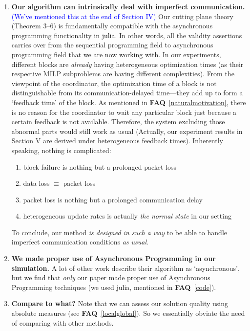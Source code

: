 \documentclass[11pt]{article}
\newcommand{\faq}[1]{\textbf{FAQ}~\ref{#1}}
\newcommand{\blue}[1]{\textcolor{blue}{#1}}
\begin{document}
\begin{enumerate}
    It works really well on my laptop.
    \item \textbf{Our algorithm can intrinsically deal with imperfect communication.}
    \label{imperfectcommunication} \blue{(We've mentioned this at the end of Section IV)}
    Our cutting plane theory (Theorem 3--6) is fundamentally compatible with
    the asynchronous programming functionality in julia. 
    In other words, all the validity assertions carries over from the sequential programming
    field to asynchronous programming field that we are now working with.
    In our experiments, different blocks are \textit{already} having heterogeneous optimization times (as their respective MILP subproblems are having different complexities).
    From the viewpoint of the coordinator, the optimization time of a block is not distinguishable from its communication-delayed time---they add up to form a `feedback time' of the block.
    As mentioned in \faq{naturalmotivation}, there is no reason for the coordinator to wait any particular block just because a certain feedback is not available.
    Therefore, the system excluding those abnormal parts would still work as usual (Actually, our experiment results in Section V are derived under heterogeneous feedback times).
    Inherently speaking, nothing is complicated:\begin{enumerate}
        \item block failure is nothing but a prolonged packet loss 
        \item data loss $\equiv$ packet loss
        \item packet loss is nothing but a prolonged communication delay
        \item heterogeneous update rates is actually \textit{the normal state} in our setting
    \end{enumerate}
    To conclude, our method \textit{is designed in such a way} to be able to handle imperfect communication conditions \textit{as usual}.
    \item \textbf{We made proper use of Asynchronous Programming in our simulation.} \label{asynccode}
    A lot of other work describe their algorithm as `asynchronous',
    but we find that \textit{only} our paper made proper use of Asynchronous Programming
    techniques (we used julia, mentioned in \faq{code}).
    \item \textbf{Compare to what?} \label{compare}
    Note that we can assess our solution quality using absolute measures (see \faq{localglobal}).
    So we essentially obviate the need of comparing with other methods.

\end{enumerate}
\end{document}
